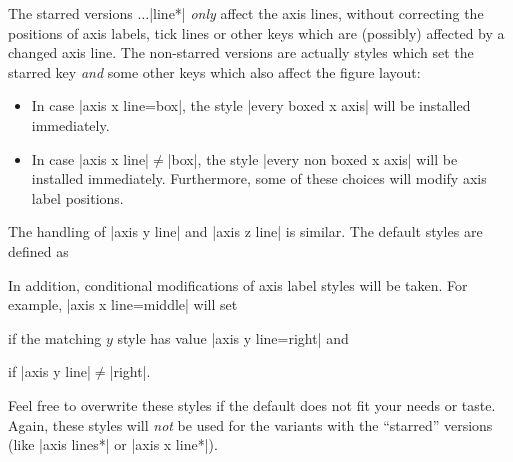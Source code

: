 \begin{pgfplotskeylist}
    The starred versions $\dotsc$|line*| \emph{only} affect the axis lines,
    without correcting the positions of axis labels, tick lines or other keys
    which are (possibly) affected by a changed axis line. The non-starred
    versions are actually styles which set the starred key \emph{and} some
    other keys which also affect the figure layout:
    \begin{itemize}
        \item In case |axis x line=box|, the style |every boxed x axis| will
            be installed immediately.
        \item In case |axis x line|$\neq$|box|, the style
            |every non boxed x axis| will be installed immediately.
            Furthermore, some of these choices will modify axis label
            positions.
    \end{itemize}
    The handling of |axis y line| and |axis z line| is similar. The default
    styles are defined as
\begin{codeexample}
\end{codeexample}
    In addition, conditional modifications of axis label styles will be taken.
    For example, |axis x line=middle| will set
\begin{codeexample}
\end{codeexample}
    if the matching $y$ style has value |axis y line=right| and
\begin{codeexample}
\end{codeexample}
    if |axis y line|$\neq$|right|.

    Feel free to overwrite these styles if the default does not fit your needs
    or taste. Again, these styles will \emph{not} be used for the variants with
    the ``starred'' versions (like |axis lines*| or |axis x line*|).

\begin{codeexample}[]
\end{codeexample}


\end{pgfplotskeylist}
